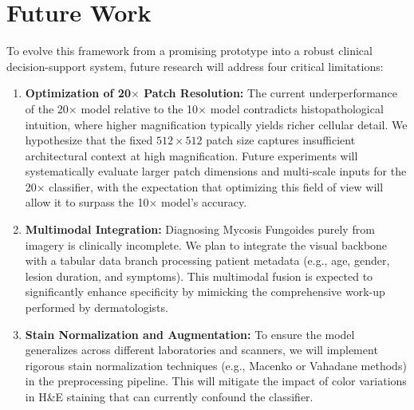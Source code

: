 \documentclass[runningheads]{llncs}
\begin{document}
\section{Future Work}
To evolve this framework from a promising prototype into a robust clinical decision-support system, future research will address four critical limitations:

\begin{enumerate}
    \item \textbf{Optimization of 20$\times$ Patch Resolution:} The current underperformance of the 20$\times$ model relative to the 10$\times$ model contradicts histopathological intuition, where higher magnification typically yields richer cellular detail. We hypothesize that the fixed $512 \times 512$ patch size captures insufficient architectural context at high magnification. Future experiments will systematically evaluate larger patch dimensions and multi-scale inputs for the 20$\times$ classifier, with the expectation that optimizing this field of view will allow it to surpass the 10$\times$ model's accuracy.
    \item \textbf{Multimodal Integration:} Diagnosing Mycosis Fungoides purely from imagery is clinically incomplete. We plan to integrate the visual backbone with a tabular data branch processing patient metadata (e.g., age, gender, lesion duration, and symptoms). This multimodal fusion is expected to significantly enhance specificity by mimicking the comprehensive work-up performed by dermatologists.
    \item \textbf{Stain Normalization and Augmentation:} To ensure the model generalizes across different laboratories and scanners, we will implement rigorous stain normalization techniques (e.g., Macenko \cite{macenko2009} or Vahadane \cite{vahadane2016_stainnorm} methods) in the preprocessing pipeline. This will mitigate the impact of color variations in H\&E staining that can currently confound the classifier.
\end{enumerate}



\end{document}
